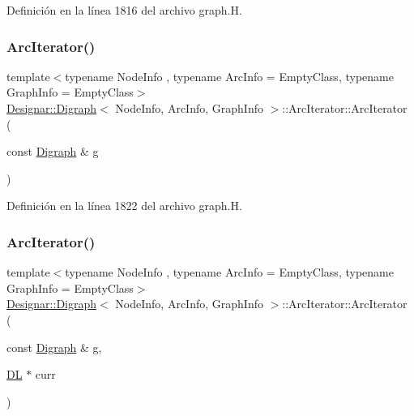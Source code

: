 Definición en la línea 1816 del archivo graph.\+H.

\mbox{\label{class_designar_1_1_digraph_1_1_arc_iterator_ac16db42766a60aa488fb4db5492c1361}} 
\subsubsection{\texorpdfstring{Arc\+Iterator()}{ArcIterator()}\hspace{0.1cm}{\footnotesize\ttfamily [2/5]}}
{\footnotesize\ttfamily template$<$typename Node\+Info , typename Arc\+Info  = Empty\+Class, typename Graph\+Info  = Empty\+Class$>$ \\
\hyperlink{class_designar_1_1_digraph}{Designar\+::\+Digraph}$<$ Node\+Info, Arc\+Info, Graph\+Info $>$\+::Arc\+Iterator\+::\+Arc\+Iterator (\begin{DoxyParamCaption}\item[{const \hyperlink{class_designar_1_1_digraph}{Digraph} \&}]{g }\end{DoxyParamCaption})\hspace{0.3cm}{\ttfamily [inline]}}



Definición en la línea 1822 del archivo graph.\+H.

\mbox{\label{class_designar_1_1_digraph_1_1_arc_iterator_ae4a8b9172d19134e71693734003ee350}} 
\subsubsection{\texorpdfstring{Arc\+Iterator()}{ArcIterator()}\hspace{0.1cm}{\footnotesize\ttfamily [3/5]}}
{\footnotesize\ttfamily template$<$typename Node\+Info , typename Arc\+Info  = Empty\+Class, typename Graph\+Info  = Empty\+Class$>$ \\
\hyperlink{class_designar_1_1_digraph}{Designar\+::\+Digraph}$<$ Node\+Info, Arc\+Info, Graph\+Info $>$\+::Arc\+Iterator\+::\+Arc\+Iterator (\begin{DoxyParamCaption}\item[{const \hyperlink{class_designar_1_1_digraph}{Digraph} \&}]{g,  }\item[{\hyperlink{class_designar_1_1_d_l}{DL} $\ast$}]{curr }\end{DoxyParamCaption})\hspace{0.3cm}{\ttfamily [inline]}}



